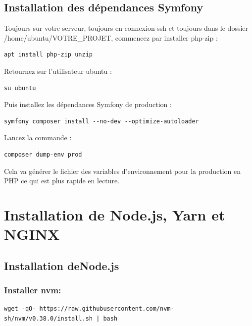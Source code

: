 \documentclass{article}
\begin{document}
\subsection{Installation des dépendances Symfony}
Toujours sur votre serveur, toujours en connexion ssh et toujours dans le dossier /home/ubuntu/VOTRE\_PROJET, commencez par installer php-zip :
\begin{verbatim}
apt install php-zip unzip
\end{verbatim}

Retournez sur l'utilisateur ubuntu :
\begin{verbatim}
su ubuntu
\end{verbatim}

Puis installez les dépendances Symfony de production :
\begin{verbatim}
symfony composer install --no-dev --optimize-autoloader
\end{verbatim}

Lancez la commande :
\begin{verbatim}
composer dump-env prod
\end{verbatim}

Cela va générer le fichier des variables d'environnement pour la production en PHP ce qui est plus rapide en lecture.

\section{Installation de Node.js, Yarn et NGINX}
\subsection{Installation deNode.js}
\subsubsection{Installer nvm:}
\begin{verbatim}
wget -qO- https://raw.githubusercontent.com/nvm-sh/nvm/v0.38.0/install.sh | bash
\end{verbatim}
\end{document}
